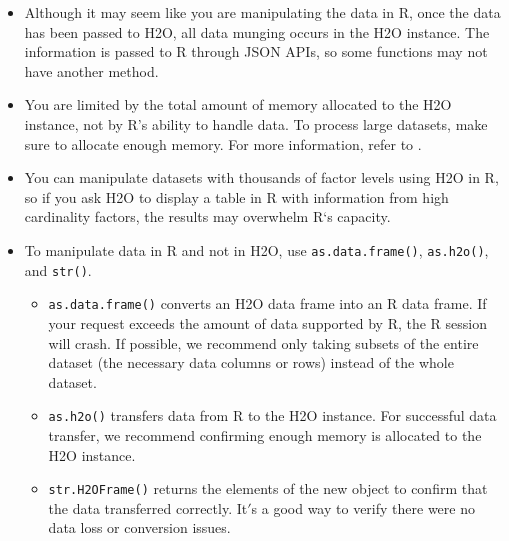 {{\begin{itemize}
\item Although it may seem like you are manipulating the data in R, once the data has been passed to H2O, all data munging occurs in the H2O instance. The information is passed to R through JSON APIs, so some functions may not have another method. 
\item You are limited by the total amount of memory allocated to the H2O instance, not by R's ability to handle data. To process large datasets, make sure to allocate enough memory. For more information, refer to {\textbf{}}. 
\item You can manipulate datasets with thousands of factor levels using H2O in R, so if you ask H2O to display a table in R with information from high cardinality factors, the results may overwhelm R`s capacity. 
\item To manipulate data in R and not in H2O, use {\texttt{as.data.frame()}}, {\texttt{as.h2o()}}, and {\texttt{str()}}. \begin{itemize}
\item {\texttt{as.data.frame()}} converts an H2O data frame into an R data frame. If your request exceeds the amount of data supported by R, the R session will crash. If possible, we recommend only taking subsets of the entire dataset (the necessary data columns or rows) instead of the whole dataset. 
\item {\texttt{as.h2o()}} transfers data from R to the H2O instance. For successful data transfer, we recommend confirming enough memory is allocated to the H2O instance.
\item {\texttt{str.H2OFrame()}} returns the elements of the new object to confirm that the data transferred correctly. It$'$s a good way to verify there were no data loss or conversion issues. %
\end{itemize}
\end{itemize}



}}
